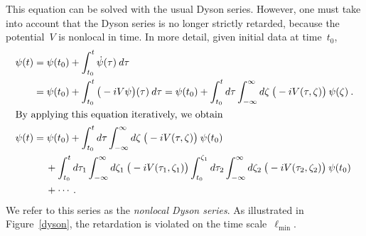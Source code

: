 \documentclass[reqno,11pt]{amsart}
\numberwithin{equation}{section}
\newcommand{\1}{\mathds{1}}
\begin{document}
This equation can be solved with the usual Dyson series. However, one must take into account that the
Dyson series is no longer strictly retarded, because the potential~$V$ is nonlocal in time.
In more detail, given initial data at time~$t_0$,
\begin{align}
\psi(t) &= \psi(t_0) + \int_{t_0}^t \dot{\psi}(\tau)\: d\tau \notag \\
&= \psi(t_0) + \int_{t_0}^t \big(-i V \psi \big)(\tau)\: d\tau = \psi(t_0) + \int_{t_0}^t d\tau \int_{-\infty}^\infty d\zeta\: \big(-i V(\tau, \zeta) \big)\: \psi(\zeta) \:. \notag \\
\intertext{By applying this equation iteratively, we obtain}
\psi(t) &=  \psi(t_0)
+ \int_{t_0}^t d\tau \int_{-\infty}^\infty d\zeta\: \big(-i V(\tau, \zeta) \big)\: \psi(t_0) \notag \\
&\quad\: + \int_{t_0}^t d\tau_1 \int_{-\infty}^\infty d\zeta_1\: \big(-i V(\tau_1, \zeta_1) \big)
\int_{t_0}^{\zeta_1} d\tau_2 \int_{-\infty}^\infty d\zeta_2\: \big(-i V(\tau_2, \zeta_2) \big)\: \psi(t_0) \notag \\
&\quad\: + \cdots \:. \label{dysonnonloc}
\end{align}
We refer to this series as the {\em{nonlocal Dyson series}}.
As illustrated in Figure~\ref{dyson}, the retardation is violated on the time scale~$\ell_{\min}$.
\end{document}
